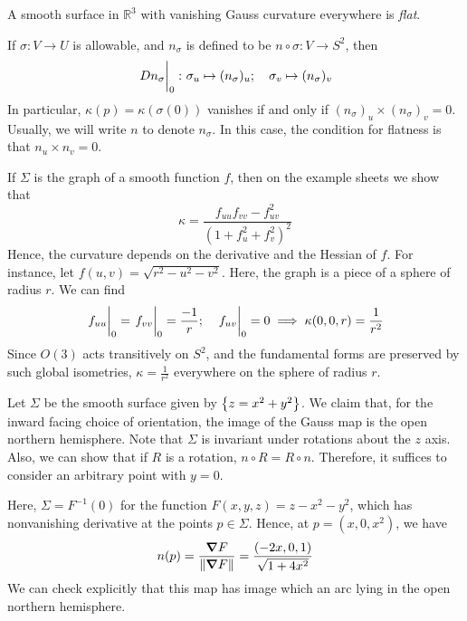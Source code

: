 \begin{definition}
	A smooth surface in \( \mathbb R^3 \) with vanishing Gauss curvature everywhere is \textit{flat}.
\end{definition}
\begin{remark}
	If \( \sigma\colon V \to U \) is allowable, and \( n_\sigma \) is defined to be \( n \circ \sigma \colon V \to S^2 \), then
	\[
		\eval{Dn_\sigma}_0 \colon \sigma_u \mapsto (n_\sigma)_u;\quad \sigma_v \mapsto (n_\sigma)_v
	\]
	In particular, \( \kappa(p) = \kappa(\sigma(0)) \) vanishes if and only if \( (n_\sigma)_u \times (n_\sigma)_v = 0 \).
	Usually, we will write \( n \) to denote \( n_\sigma \).
	In this case, the condition for flatness is that \( n_u \times n_v = 0 \).
\end{remark}
\begin{example}
	If \( \Sigma \) is the graph of a smooth function \( f \), then on the example sheets we show that
	\[
		\kappa = \frac{f_{uu} f_{vv} - f_{uv}^2}{(1+f_u^2 + f_v^2)^2}
	\]
	Hence, the curvature depends on the derivative and the Hessian of \( f \).
	For instance, let \( f(u,v) = \sqrt{r^2 - u^2 - v^2} \).
	Here, the graph is a piece of a sphere of radius \( r \).
	We can find
	\[
		\eval{f_{uu}}_0 = \eval{f_{vv}}_0 = \frac{-1}{r};\quad \eval{f_{uv}}_0 = 0 \implies \kappa(0,0,r) = \frac{1}{r^2}
	\]
	Since \( O(3) \) acts transitively on \( S^2 \), and the fundamental forms are preserved by such global isometries, \( \kappa = \frac{1}{r^2} \) everywhere on the sphere of radius \( r \).
\end{example}
\begin{example}
	Let \( \Sigma \) be the smooth surface given by \( \qty{z = x^2 + y^2} \).
	We claim that, for the inward facing choice of orientation, the image of the Gauss map is the open northern hemisphere.
	Note that \( \Sigma \) is invariant under rotations about the \( z \) axis.
	Also, we can show that if \( R \) is a rotation, \( n \circ R = R \circ n \).
	Therefore, it suffices to consider an arbitrary point with \( y = 0 \).

	Here, \( \Sigma = F^{-1}(0) \) for the function \( F(x,y,z) = z - x^2 - y^2 \), which has nonvanishing derivative at the points \( p \in \Sigma \).
	Hence, at \( p = (x,0,x^2) \), we have
	\[
		n(p) = \frac{\grad{F}}{\norm{\grad{F}}} = \frac{(-2x,0,1)}{\sqrt{1+4x^2}}
	\]
	We can check explicitly that this map has image which an arc lying in the open northern hemisphere.
\end{example}

